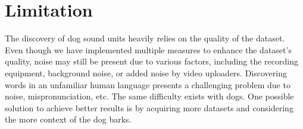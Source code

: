 \section*{Limitation}

The discovery of dog sound units heavily relies on the quality of the dataset. 
Even though we have implemented multiple measures to enhance the dataset's quality, noise may still be present due to various factors, including the recording equipment, background noise, or added noise by video uploaders. 
Discovering words in an unfamiliar human language presents a challenging problem due to noise, mispronunciation, etc. The same difficulty exists with dogs. One possible solution to achieve better results is by acquiring more datasets and considering the more context of the dog barks.

